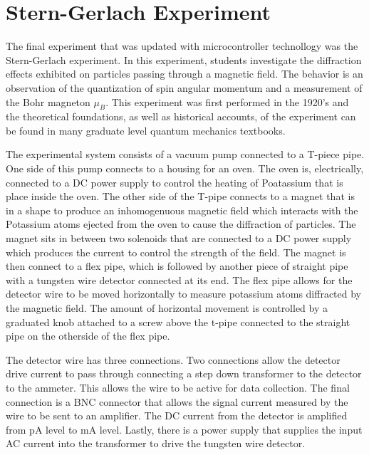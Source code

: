 \section{Stern-Gerlach Experiment}

The final experiment that was updated with microcontroller technollogy was the Stern-Gerlach experiment.
In this experiment, students investigate the diffraction effects exhibited on particles passing through a magnetic field.
The behavior is an observation of the quantization of spin angular momentum and a measurement of the Bohr magneton $\mu_{B}$.
This experiment was first performed in the 1920's and the theoretical foundations, as well as historical accounts, of the experiment can be found in many graduate level quantum mechanics textbooks.

The experimental system consists of a vacuum pump connected to a T-piece pipe.
One side of this pump connects to a housing for an oven.
The oven is, electrically, connected to a DC power supply to control the heating of Poatassium that is place inside the oven.
The other side of the T-pipe connects to a magnet that is in a shape to produce an inhomogenuous magnetic field which interacts with the Potassium atoms ejected from the oven to cause the diffraction of particles.
The magnet sits in between two solenoids that are connected to a DC power supply which produces the current to control the strength of the field.
The magnet is then connect to a flex pipe, which is followed by another piece of straight pipe with a tungsten wire detector connected at its end.
The flex pipe allows for the detector wire to be moved horizontally to measure potassium atoms diffracted by the magnetic field.
The amount of horizontal movement is controlled by a graduated knob attached to a screw above the t-pipe connected to the straight pipe on the otherside of the flex pipe.


The detector wire has three connections.
Two connections allow the detector drive current to pass through connecting a step down transformer to the detector to the ammeter.
This allows the wire to be active for data collection.
The final connection is a BNC connector that allows the signal current measured by the wire to be sent to an amplifier.
The DC current from the detector is amplified from pA level to mA level.
Lastly, there is a power supply that supplies the input AC current into the transformer to drive the tungsten wire detector.

